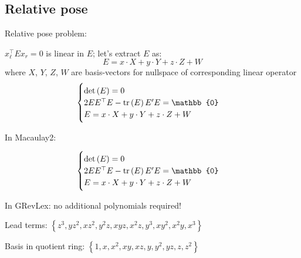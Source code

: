 \subsection{Relative pose}
\begin{frame}
    Relative pose problem:

    $x_\ell^\top E x_r = 0$ is linear in $E$; \pause let's extract $E$ as:
    $$E=x\cdot X + y\cdot Y + z\cdot Z + W$$
    where $X$, $Y$, $Z$, $W$ are basis-vectors for nullspace of corresponding linear operator
    $$
    \begin{cases}
        \det\left(E\right)=0\\
        2EE^\top E -\tr\left(E\right)E'E=\mathbb{0} \\
        E=x\cdot X + y\cdot Y + z\cdot Z + W
    \end{cases}
    $$
\end{frame}

\begin{frame}
    In Macaulay2:
    \only<1>{
    
}
\end{frame}

\begin{frame}
    $$
    \begin{cases}
        \det\left(E\right)=0\\
        2EE^\top E -\tr\left(E\right)E'E=\mathbb{0} \\
        E=x\cdot X + y\cdot Y + z\cdot Z + W
    \end{cases}
    $$

    In GRevLex: no additional polynomials required!

    Lead terms:  $\left\{z^3, yz^2, xz^2, y^2z, xyz, x^2z, y^3, xy^2, x^2y, x^3\right\}$

    Basis in quotient ring: $\left\{1, x, x^2, xy, xz, y, y^2, yz, z, z^2\right\}$
\end{frame}


